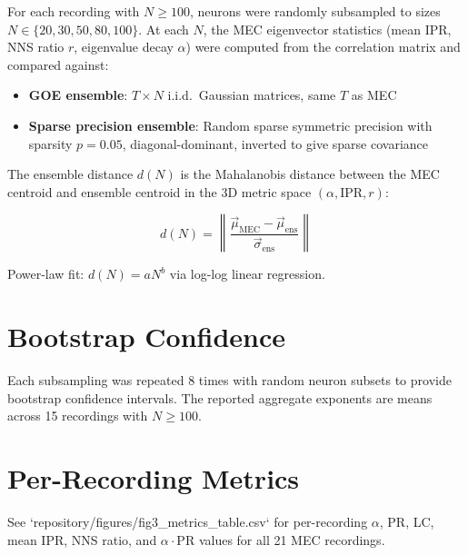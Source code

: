 \documentclass[aps,prx,onecolumn,twoside,showpacs,superscriptaddress]{revtex4-2}
\begin{document}
For each recording with $N \geq 100$, neurons were randomly subsampled to sizes
$N \in \{20, 30, 50, 80, 100\}$. At each $N$, the MEC eigenvector statistics
(mean IPR, NNS ratio $r$, eigenvalue decay $\alpha$) were computed from the
correlation matrix and compared against:

\begin{itemize}
  \item \textbf{GOE ensemble}: $T \times N$ i.i.d.\ Gaussian matrices, same $T$ as MEC
  \item \textbf{Sparse precision ensemble}: Random sparse symmetric precision
    with sparsity $p=0.05$, diagonal-dominant, inverted to give sparse covariance
\end{itemize}

The ensemble distance $d(N)$ is the Mahalanobis distance between the MEC centroid
and ensemble centroid in the 3D metric space $(\alpha, \text{IPR}, r)$:

\[
d(N) = \left\| \frac{\vec{\mu}_{\text{MEC}} - \vec{\mu}_{\text{ens}}}{\vec{\sigma}_{\text{ens}}} \right\|
\]

Power-law fit: $d(N) = a N^b$ via log-log linear regression.

\section{Bootstrap Confidence}

Each subsampling was repeated 8 times with random neuron subsets to provide
bootstrap confidence intervals. The reported aggregate exponents are means
across 15 recordings with $N \geq 100$.

\section{Per-Recording Metrics}

See `repository/figures/fig3_metrics_table.csv` for per-recording $\alpha$, PR,
LC, mean IPR, NNS ratio, and $\alpha \cdot \mathrm{PR}$ values for all 21
MEC recordings.
\end{document}

